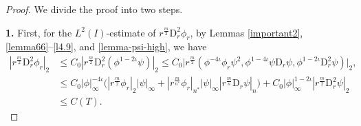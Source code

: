 \documentclass[11pt,reqno]{amsart}
\numberwithin{rk}{section}
\numberwithin{prop}{section}
\numberwithin{mydef}{section}
\numberwithin{lem}{section}
\numberwithin{equation}{section}
\numberwithin{thm}{section}
\begin{document}
\begin{proof} We divide the proof into two steps.

\smallskip
\textbf{1.} First, for the $L^2(I)$-estimate of $r^\frac{m}{2}\mathrm{D}_r^2 \phi_r$, by Lemmas \ref{important2}, \ref{lemma66}--\ref{l4.9}, and \ref{lemma-psi-high}, we have
\begin{equation}\label{lem612-2}
\begin{aligned}
|r^\frac{m}{2}\mathrm{D}_r^2 \phi_r|_2&\leq C_0|r^\frac{m}{2}\mathrm{D}_r^2(\phi^{1-2\iota}\psi)|_2\leq  C_0\big|r^\frac{m}{2}(\phi^{-4\iota}\phi_r\psi^2,\phi^{1-4\iota} \psi\mathrm{D}_r\psi,\phi^{1-2\iota}\mathrm{D}_r^2\psi)\big|_2,\\
&\leq C_0|\phi|_\infty^{-4\iota}\big(|r^\frac{m}{2}\phi_{r}|_2|\psi|_\infty +|r^\frac{m}{n^*} \phi_r|_{n^*} |\psi|_\infty|r^\frac{m}{n}\mathrm{D}_r\psi|_n\big)+C_0|\phi|_\infty^{1-2\iota}  |r^\frac{m}{2}\mathrm{D}_r^2\psi|_2 \\
&\leq C(T).
\end{aligned}
\end{equation}


\end{proof}
\end{document}

